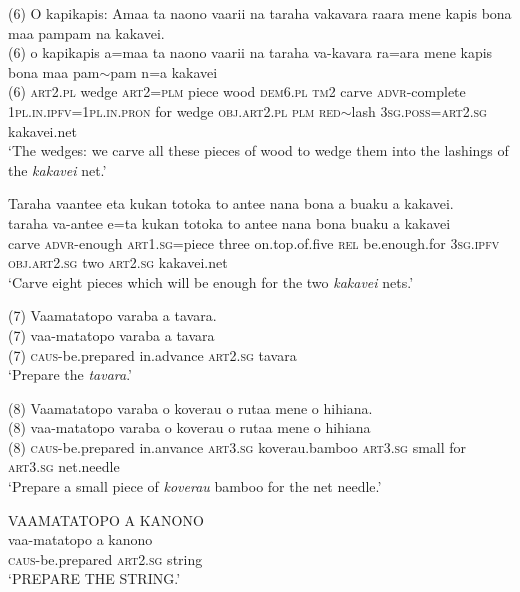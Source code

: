 \ea\label{ex:text22-31}
(6) O kapikapis: Amaa ta naono vaarii na taraha vakavara raara mene kapis bona maa pampam na kakavei.\\
\gll (6)	o	kapikapis	a=maa	ta	naono	vaarii	na	taraha	va-kavara	ra=ara	mene	kapis	bona	maa	pam{$\sim$}pam	n=a	kakavei\\
     (6)	\textsc{art}2.\textsc{pl}	wedge	\textsc{art}2=\textsc{plm}	piece	wood	\textsc{dem}6.\textsc{pl}	\textsc{tm}2	carve	\textsc{advr}-complete	1\textsc{pl}.\textsc{in}.\textsc{ipfv}=1\textsc{pl}.\textsc{in}.\textsc{pron}	for	wedge	\textsc{obj}.\textsc{art}2.\textsc{pl}	\textsc{plm}	\textsc{red}{$\sim$}lash	3\textsc{sg}.\textsc{poss}=\textsc{art}2.\textsc{sg}	kakavei.net\\
\glt `The wedges: we carve all these pieces of wood to wedge them into the lashings of the \textit{kakavei} net.'
\z

\ea\label{ex:text22-32}
Taraha vaantee eta kukan totoka to antee nana bona a buaku a kakavei.\\
\gll taraha	va-antee	e=ta	kukan	totoka	to	antee	nana	bona	buaku	a	kakavei\\
     carve	\textsc{advr}-enough	\textsc{art}1.\textsc{sg}=piece	three	on.top.of.five	\textsc{rel}	be.enough.for	3\textsc{sg}.\textsc{ipfv}	\textsc{obj}.\textsc{art}2.\textsc{sg}	two	\textsc{art}2.\textsc{sg}	kakavei.net\\
\glt `Carve eight pieces which will be enough for the two \textit{kakavei} nets.'
\z

\newpage
\ea\label{ex:text22-33}
(7) Vaamatatopo varaba a tavara.\\
\gll (7)	vaa-matatopo	varaba	a	tavara\\
     (7)	\textsc{caus}-be.prepared	in.advance	\textsc{art}2.\textsc{sg}	tavara\\
\glt `Prepare the \textit{tavara}.'
\z

\ea\label{ex:text22-34}
(8) Vaamatatopo varaba o koverau o rutaa mene o hihiana.\\
\gll (8)	vaa-matatopo	varaba	o	koverau	o	rutaa	mene	o	hihiana\\
     (8)	\textsc{caus}-be.prepared	in.anvance	\textsc{art}3.\textsc{sg}	koverau.bamboo	\textsc{art}3.\textsc{sg}	small	for	\textsc{art}3.\textsc{sg}	net.needle\\
\glt `Prepare a small piece of \textit{koverau} bamboo for the net needle.'
\z

\ea\label{ex:text22-35}
VAAMATATOPO A KANONO\\
\gll vaa-matatopo	a	kanono\\
     \textsc{caus}-be.prepared	\textsc{art}2.\textsc{sg}	string\\
\glt `PREPARE THE STRING.'
\z

